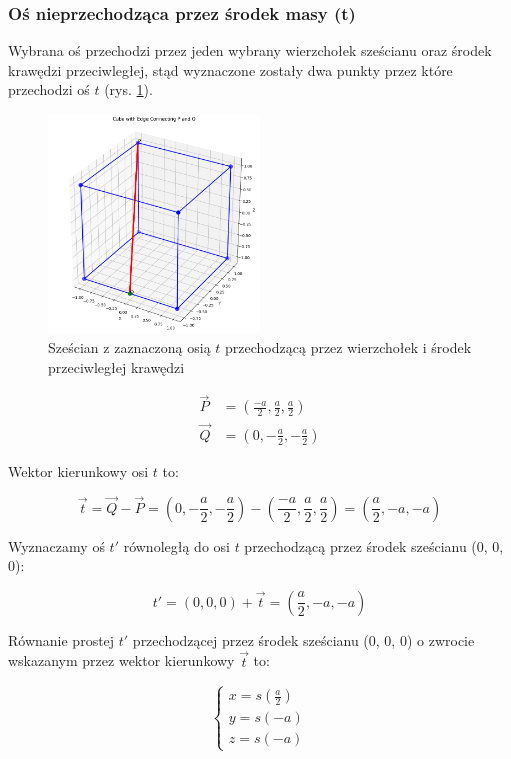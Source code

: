 \documentclass[a4paper,12pt]{article}
\begin{document}
\subsubsection{Oś nieprzechodząca przez środek masy (t)}

Wybrana oś przechodzi przez jeden wybrany wierzchołek sześcianu oraz środek krawędzi przeciwległej, stąd wyznaczone zostały dwa punkty przez które przechodzi oś $t$ (rys. \ref{fig:cube}).

\begin{figure}[H]
    \centering
    \includegraphics[width=0.5\textwidth]{cube.png}
    \caption{Sześcian z zaznaczoną osią $t$ przechodzącą przez wierzchołek i środek przeciwległej krawędzi}
    \label{fig:cube}
\end{figure}



\begin{align*}
    \vec{P} & = (\frac{-a}{2}, \frac{a}{2}, \frac{a}{2}) \\
    \vec{Q} & = (0, -\frac{a}{2}, -\frac{a}{2})
\end{align*}

Wektor kierunkowy osi $t$ to:

$$
    \vec{t} = \vec{Q} - \vec{P} = (0, -\frac{a}{2}, -\frac{a}{2}) - (\frac{-a}{2}, \frac{a}{2}, \frac{a}{2}) = (\frac{a}{2}, -a, -a)
$$


Wyznaczamy oś $t'$ równoległą do osi $t$ przechodzącą przez środek sześcianu (0, 0, 0):

$$
    t' = (0, 0, 0) + \vec{t} = (\frac{a}{2}, -a, -a)
$$



Równanie prostej $t'$ przechodzącej przez środek sześcianu (0, 0, 0) o zwrocie wskazanym przez wektor kierunkowy $\vec{t}$ to:

$$
    \begin{cases}
        x = s(\frac{a}{2}) \\
        y = s(-a)          \\
        z = s(-a)
    \end{cases}
$$
\end{document}
